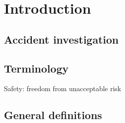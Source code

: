 










\chapter{Introduction}

\section{Accident investigation}


\section{Terminology}
Safety: freedom from unacceptable risk


\section{General definitions}

